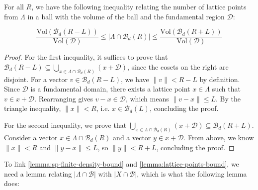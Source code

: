 \begin{lemma}\label{lemma:lattice-points-bound}\leanok
  For all $R$, we have the following inequality relating the number of lattice points from $\Lambda$ in a ball with the volume of the ball and the fundamental region $\mathcal{D}$:

  \[
    \frac{\mathrm{Vol}(\mathcal{B}_d(R - L))}{\mathrm{Vol}(\mathcal{D})}
    \leq \left|\Lambda \cap \mathcal{B}_d(R)\right|
    \leq \frac{\mathrm{Vol}(\mathcal{B}_d(R + L))}{\mathrm{Vol}(\mathcal{D})}
  \]
\end{lemma}
\begin{proof}\leanok
For the first inequality, it suffices to prove that $\mathcal{B}_d(R - L) \subseteq \bigcup_{x \in \Lambda \cap \mathcal{B}_d(R)} (x + \mathcal{D})$, since the cosets on the right are disjoint. For a vector $v \in \mathcal{B}_d(R - L)$, we have $\|v\| < R - L$ by definition. Since $\mathcal{D}$ is a fundamental domain, there exists a lattice point $x \in \Lambda$ such that $v \in x + \mathcal{D}$. Rearranging gives $v - x \in \mathcal{D}$, which means $\|v - x\| \leq L$. By the triangle inequality, $\|x\| < R$, i.e. $x \in \mathcal{B}_d(L)$, concluding the proof.

For the second inequality, we prove that $\bigcup_{x \in \Lambda \cap \mathcal{B}_d(R)} (x + \mathcal{D}) \subseteq \mathcal{B}_d(R + L)$. Consider a vector $x \in \Lambda \cap \mathcal{B}_d(R)$ and a vector $y \in x + \mathcal{D}$. From above, we know $\|x\| < R$ and $\|y - x\| \leq L$, so $\|y\| < R + L$, concluding the proof.
\end{proof}

To link \cref{lemma:sp-finite-density-bound} and \cref{lemma:lattice-points-bound}, we need a lemma relating $|\Lambda \cap \mathcal{B}|$ with $|X \cap \mathcal{B}|$, which is what the following lemma does:

